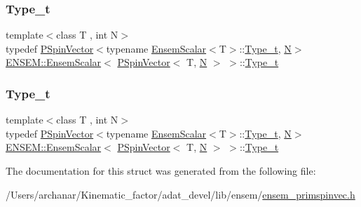 \subsubsection{\texorpdfstring{Type\_t}{Type\_t}\hspace{0.1cm}{\footnotesize\ttfamily [1/2]}}
{\footnotesize\ttfamily template$<$class T , int N$>$ \\
typedef \mbox{\hyperlink{classENSEM_1_1PSpinVector}{P\+Spin\+Vector}}$<$typename \mbox{\hyperlink{structENSEM_1_1EnsemScalar}{Ensem\+Scalar}}$<$T$>$\+::\mbox{\hyperlink{structENSEM_1_1EnsemScalar_3_01PSpinVector_3_01T_00_01N_01_4_01_4_aef6767dcaa0dee58e84534fb1554dd11}{Type\+\_\+t}}, \mbox{\hyperlink{operator__name__util_8cc_a7722c8ecbb62d99aee7ce68b1752f337}{N}}$>$ \mbox{\hyperlink{structENSEM_1_1EnsemScalar}{E\+N\+S\+E\+M\+::\+Ensem\+Scalar}}$<$ \mbox{\hyperlink{classENSEM_1_1PSpinVector}{P\+Spin\+Vector}}$<$ T, \mbox{\hyperlink{operator__name__util_8cc_a7722c8ecbb62d99aee7ce68b1752f337}{N}} $>$ $>$\+::\mbox{\hyperlink{structENSEM_1_1EnsemScalar_3_01PSpinVector_3_01T_00_01N_01_4_01_4_aef6767dcaa0dee58e84534fb1554dd11}{Type\+\_\+t}}}

\mbox{\label{structENSEM_1_1EnsemScalar_3_01PSpinVector_3_01T_00_01N_01_4_01_4_aef6767dcaa0dee58e84534fb1554dd11}} 
\subsubsection{\texorpdfstring{Type\_t}{Type\_t}\hspace{0.1cm}{\footnotesize\ttfamily [2/2]}}
{\footnotesize\ttfamily template$<$class T , int N$>$ \\
typedef \mbox{\hyperlink{classENSEM_1_1PSpinVector}{P\+Spin\+Vector}}$<$typename \mbox{\hyperlink{structENSEM_1_1EnsemScalar}{Ensem\+Scalar}}$<$T$>$\+::\mbox{\hyperlink{structENSEM_1_1EnsemScalar_3_01PSpinVector_3_01T_00_01N_01_4_01_4_aef6767dcaa0dee58e84534fb1554dd11}{Type\+\_\+t}}, \mbox{\hyperlink{operator__name__util_8cc_a7722c8ecbb62d99aee7ce68b1752f337}{N}}$>$ \mbox{\hyperlink{structENSEM_1_1EnsemScalar}{E\+N\+S\+E\+M\+::\+Ensem\+Scalar}}$<$ \mbox{\hyperlink{classENSEM_1_1PSpinVector}{P\+Spin\+Vector}}$<$ T, \mbox{\hyperlink{operator__name__util_8cc_a7722c8ecbb62d99aee7ce68b1752f337}{N}} $>$ $>$\+::\mbox{\hyperlink{structENSEM_1_1EnsemScalar_3_01PSpinVector_3_01T_00_01N_01_4_01_4_aef6767dcaa0dee58e84534fb1554dd11}{Type\+\_\+t}}}



The documentation for this struct was generated from the following file\+:\begin{DoxyCompactItemize}
\item 
/\+Users/archanar/\+Kinematic\+\_\+factor/adat\+\_\+devel/lib/ensem/\mbox{\hyperlink{lib_2ensem_2ensem__primspinvec_8h}{ensem\+\_\+primspinvec.\+h}}\end{DoxyCompactItemize}
